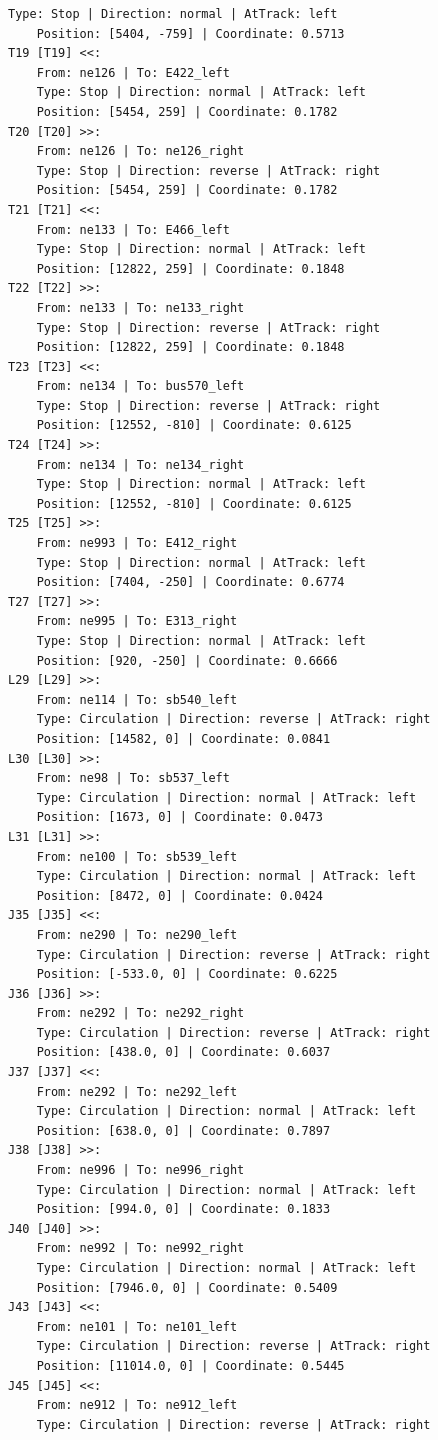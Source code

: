 \begin{lstlisting}[language = {}, tabsize=4, basicstyle=\footnotesize\ttfamily, showspaces=false, showstringspaces=false, caption = Signalling.RNA, label = {lst:EJ4_6}]
	Type: Stop | Direction: normal | AtTrack: left 
	Position: [5404, -759] | Coordinate: 0.5713
T19 [T19] <<:
	From: ne126 | To: E422_left
	Type: Stop | Direction: normal | AtTrack: left 
	Position: [5454, 259] | Coordinate: 0.1782
T20 [T20] >>:
	From: ne126 | To: ne126_right
	Type: Stop | Direction: reverse | AtTrack: right 
	Position: [5454, 259] | Coordinate: 0.1782
T21 [T21] <<:
	From: ne133 | To: E466_left
	Type: Stop | Direction: normal | AtTrack: left 
	Position: [12822, 259] | Coordinate: 0.1848
T22 [T22] >>:
	From: ne133 | To: ne133_right
	Type: Stop | Direction: reverse | AtTrack: right 
	Position: [12822, 259] | Coordinate: 0.1848
T23 [T23] <<:
	From: ne134 | To: bus570_left
	Type: Stop | Direction: reverse | AtTrack: right 
	Position: [12552, -810] | Coordinate: 0.6125
T24 [T24] >>:
	From: ne134 | To: ne134_right
	Type: Stop | Direction: normal | AtTrack: left 
	Position: [12552, -810] | Coordinate: 0.6125
T25 [T25] >>:
	From: ne993 | To: E412_right
	Type: Stop | Direction: normal | AtTrack: left 
	Position: [7404, -250] | Coordinate: 0.6774
T27 [T27] >>:
	From: ne995 | To: E313_right
	Type: Stop | Direction: normal | AtTrack: left 
	Position: [920, -250] | Coordinate: 0.6666
L29 [L29] >>:
	From: ne114 | To: sb540_left
	Type: Circulation | Direction: reverse | AtTrack: right 
	Position: [14582, 0] | Coordinate: 0.0841
L30 [L30] >>:
	From: ne98 | To: sb537_left
	Type: Circulation | Direction: normal | AtTrack: left 
	Position: [1673, 0] | Coordinate: 0.0473
L31 [L31] >>:
	From: ne100 | To: sb539_left
	Type: Circulation | Direction: normal | AtTrack: left 
	Position: [8472, 0] | Coordinate: 0.0424
J35 [J35] <<:
	From: ne290 | To: ne290_left
	Type: Circulation | Direction: reverse | AtTrack: right 
	Position: [-533.0, 0] | Coordinate: 0.6225
J36 [J36] >>:
	From: ne292 | To: ne292_right
	Type: Circulation | Direction: reverse | AtTrack: right 
	Position: [438.0, 0] | Coordinate: 0.6037
J37 [J37] <<:
	From: ne292 | To: ne292_left
	Type: Circulation | Direction: normal | AtTrack: left 
	Position: [638.0, 0] | Coordinate: 0.7897
J38 [J38] >>:
	From: ne996 | To: ne996_right
	Type: Circulation | Direction: normal | AtTrack: left 
	Position: [994.0, 0] | Coordinate: 0.1833
J40 [J40] >>:
	From: ne992 | To: ne992_right
	Type: Circulation | Direction: normal | AtTrack: left 
	Position: [7946.0, 0] | Coordinate: 0.5409
J43 [J43] <<:
	From: ne101 | To: ne101_left
	Type: Circulation | Direction: reverse | AtTrack: right 
	Position: [11014.0, 0] | Coordinate: 0.5445
J45 [J45] <<:
	From: ne912 | To: ne912_left
	Type: Circulation | Direction: reverse | AtTrack: right 

\end{lstlisting}
